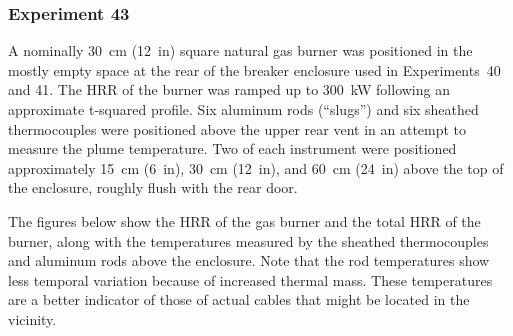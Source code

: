 \clearpage

\subsubsection{Experiment 43}

A nominally 30~cm (12~in) square natural gas burner was positioned in the mostly empty space at the rear of the breaker enclosure used in Experiments~40 and 41. The HRR of the burner was ramped up to 300~kW following an approximate t-squared profile. Six aluminum rods (``slugs'') and six sheathed thermocouples were positioned above the upper rear vent in an attempt to measure the plume temperature. Two of each instrument were positioned approximately 15~cm (6~in), 30~cm (12~in), and 60~cm (24~in) above the top of the enclosure, roughly flush with the rear door.

The figures below show the HRR of the gas burner and the total HRR of the burner, along with the temperatures measured by the sheathed thermocouples and aluminum rods above the enclosure. Note that the rod temperatures show less temporal variation because of increased thermal mass. These temperatures are a better indicator of those of actual cables that might be located in the vicinity.

